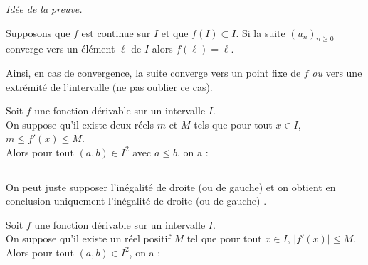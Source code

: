 \documentclass[a4paper,10pt]{report}
\begin{document}
\noindent \textit{Idée de la preuve.}

\vspace{10cm}

\begin{prop} Supposons que $f$ est continue sur $I$ et que $f(I) \subset I$. Si la suite $(u_n)_{n \geq 0}$ converge vers un élément $\ell$ de $I$ alors $f(\ell)= \ell$.
\end{prop}

\begin{rem} Ainsi, en cas de convergence, la suite converge vers un point fixe de $f$ \textit{ou} vers une extrémité de l'intervalle (ne pas oublier ce cas).
\end{rem}

\begin{thm}
Soit $f$ une fonction dérivable sur un intervalle $I$. \\
On suppose qu'il existe deux réels $m$ et $M$ tels que pour tout $x \in I$, $m \leq f'(x) \leq M$.\\
Alors pour tout $(a,b) \in I^2$ avec $a \leq b$, on a :
 $$ \phantom{m(b-a) \leq f(b)-f(a) \leq M (b-a)}$$
\end{thm}

\begin{rem} On peut juste supposer l'inégalité \og  de droite (ou de gauche) \fg et on obtient en conclusion uniquement  l'inégalité \og  de droite (ou de gauche) \fg .
\end{rem}

\begin{cor}
Soit $f$ une fonction dérivable sur un intervalle $I$.\\
On suppose qu'il existe un réel positif $M$ tel que  pour tout $x \in I$, $ |f'(x)| \leq M$. \\ 
Alors pour tout $(a,b) \in I^2$, on a :
$$\phantom{ |f(b)-f(a)| \leq M |b-a|}$$
\end{cor}
\end{document}
